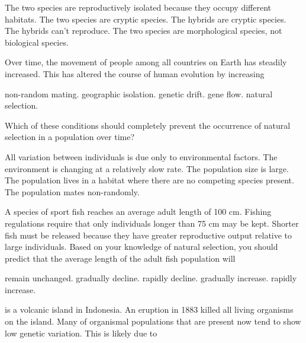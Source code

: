 \begin{choices}
\choice The two species are reproductively isolated because they occupy different habitats.%
\choice The two species are cryptic species.%
\choice The hybrids are cryptic species.%
\correctchoice The hybrids can't reproduce.%
\choice The two species are morphological species, not biological species.%
\end{choices}

\question
Over time, the movement of people among all countries on Earth has steadily increased. This has altered the course of human evolution by increasing

\begin{choices}
\choice non-random mating. %
\choice geographic isolation. %
\choice genetic drift. %
\correctchoice gene flow. %
\choice natural selection. %
\end{choices}

\question
Which of these conditions should completely prevent the occurrence of natural selection in a population over time?

\begin{choices}
\correctchoice All variation between individuals is due only to environmental factors. %
\choice The environment is changing at a relatively slow rate. %
\choice The population size is large. %
\choice The population lives in a habitat where there are no competing species present. %
\choice The population mates non-randomly.%
\end{choices}

\question
A species of sport fish reaches an average adult length of 100 cm. Fishing regulations require that only individuals longer than 75 cm may be kept. Shorter fish must be released because they have greater reproductive output relative to large individuals. Based on your knowledge of natural selection, you should predict that the average length of the adult fish population will

\begin{choices}
\correctchoice remain unchanged. %
\choice gradually decline. %
\choice rapidly decline. %
\choice gradually increase. %
\choice rapidly increase. %
\end{choices}

\question
\Krakatou is a volcanic island in Indonesia.  An eruption in 1883 killed all living organisms on the island.  Many of organismal populations that are present now tend to show low genetic variation.  This is likely due to

